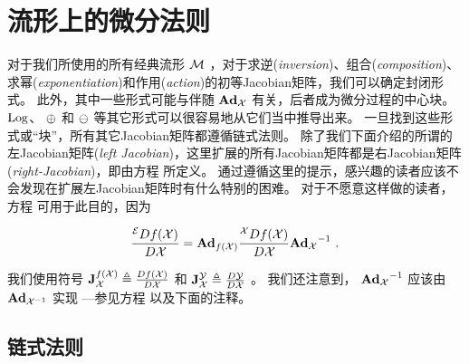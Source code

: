 
\section{流形上的微分法则}
\label{sec:derivatives_M}

对于我们所使用的所有经典流形 $\cM$ ，对于求逆(\emph{inversion})、组合(\emph{composition})、求幂(\emph{exponentiation})和作用(\emph{action})的初等Jacobian矩阵，我们可以确定封闭形式。
此外，其中一些形式可能与伴随 $\Ad[\cM]{\cX}$ 有关，后者成为微分过程的中心块。
$\Log$、 $\op$ 和 $\om$ 等其它形式可以很容易地从它们当中推导出来。
一旦找到这些形式或“块”，所有其它Jacobian矩阵都遵循链式法则。
除了我们下面介绍的所谓的左Jacobian矩阵(\emph{left Jacobian})，这里扩展的所有Jacobian矩阵都是右Jacobian矩阵(\emph{right-Jacobian})，即由方程  所定义。
通过遵循这里的提示，感兴趣的读者应该不会发现在扩展左Jacobian矩阵时有什么特别的困难。
对于不愿意这样做的读者，方程  可用于此目的，因为


%
\begin{align}
\ldpar{f(\cX)}{\cX} = \Ad[\cN]{f(\cX)}\rdpar{f(\cX)}{\cX} \Ad[\cM]{\cX}\inv
~.
\end{align}


我们使用符号 $\mjac{f(\cX)}{\cX}\te\ndpar{f(\cX)}{\cX}$ 和 $\mjac{\cY}{\cX}\te\ndpar{\cY}{\cX}$ 。
我们还注意到， $\Ad[\cM]{\cX}\inv$ 应该由 $\Ad[\cM]{\cX\inv}$ 实现 ---参见方程  以及下面的注释。



\subsection{链式法则}
\label{sec:jacs_chain_rule}

